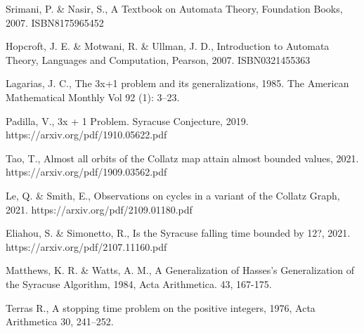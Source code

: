 \documentclass{jams-l}
\theoremstyle{definition}
\theoremstyle{remark}
\numberwithin{equation}{section}
\begin{document}
    
    \begin{thebibliography}{10}
    
    	Srimani, P. \& Nasir, S., A Textbook on Automata Theory, Foundation Books, 2007. ISBN8175965452
    	
    	Hopcroft, J. E. \& Motwani, R. \& Ullman, J. D., Introduction to Automata Theory, Languages and Computation, Pearson, 2007. ISBN0321455363
    	
    	Lagarias, J. C., The 3x+1 problem and its generalizations, 1985. The American Mathematical Monthly Vol 92 (1): 3–23.
    	
    	Padilla, V., 3x + 1 Problem. Syracuse Conjecture, 2019. https://arxiv.org/pdf/1910.05622.pdf
    	
    	Tao, T.,  Almost all orbits of the Collatz map attain almost bounded values, 2021. https://arxiv.org/pdf/1909.03562.pdf
    	
    	Le, Q. \& Smith, E., Observations on cycles in a variant of the Collatz Graph, 2021. https://arxiv.org/pdf/2109.01180.pdf
    	
    	Eliahou, S. \& Simonetto, R., Is the Syracuse falling time bounded by 12?, 2021. https://arxiv.org/pdf/2107.11160.pdf
    	
    		Matthews, K. R. \& Watts, A. M., A Generalization of Hasses's Generalization of the Syracuse Algorithm, 1984, Acta Arithmetica. 43, 167-175.
    	
    	 Terras R., A stopping time problem on the positive integers, 1976, Acta Arithmetica 30, 241–252.
    
    \end{thebibliography}
\end{document}
